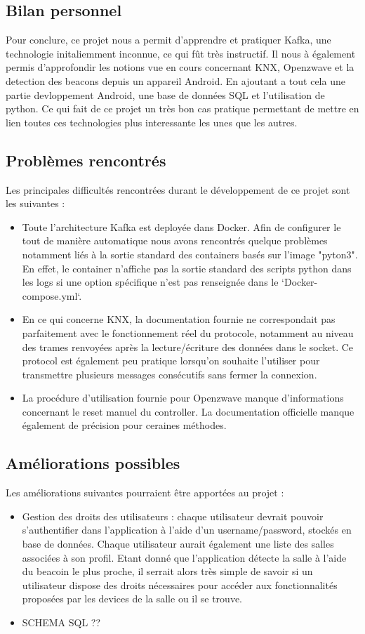 \subsection{Bilan personnel}
Pour conclure, ce projet nous a permit d'apprendre et pratiquer Kafka, une technologie initaliemment inconnue, ce qui fût très instructif. Il nous à également permis d'approfondir les notions vue en cours concernant KNX, Openzwave et la detection des beacons depuis un appareil Android. En ajoutant a tout cela une partie devloppement Android, une base de données SQL et l'utilisation de python. Ce qui fait de ce projet un très bon cas pratique permettant de mettre en lien toutes ces technologies plus interessante les unes que les autres.

\subsection{Problèmes rencontrés}
Les principales difficultés rencontrées durant le développement de ce projet sont les suivantes :
\begin{itemize}
    \item Toute l'architecture Kafka est deployée dans Docker. Afin de configurer le tout de manière automatique nous avons rencontrés quelque problèmes notamment liés à la sortie standard des containers basés sur l'image "pyton3". En effet, le container n'affiche pas la sortie standard des scripts python dans les logs si une option spécifique n'est pas renseignée dans le `Docker-compose.yml`.
    \item En ce qui concerne KNX, la documentation fournie ne correspondait pas parfaitement avec le fonctionnement réel du protocole, notamment au niveau des trames renvoyées après la lecture/écriture des données dans le socket. Ce protocol est également peu pratique lorsqu'on souhaite l'utiliser pour transmettre plusieurs messages consécutifs sans fermer la connexion.
    \item La procédure d'utilisation fournie pour Openzwave manque d'informations concernant le reset manuel du controller. La documentation officielle manque également de précision pour ceraines méthodes.
\end{itemize}

\subsection{Améliorations possibles}
Les améliorations suivantes pourraient être apportées au projet :
\begin{itemize}
    \item Gestion des droits des utilisateurs : chaque utilisateur devrait pouvoir s'authentifier dans l'application à l'aide d'un username/password, stockés en base de données. Chaque utilisateur aurait également une liste des salles associées à son profil. Etant donné que l'application détecte la salle à l'aide du beacoin le plus proche, il serrait alors très simple de savoir si un utilisateur dispose des droits nécessaires pour accéder aux fonctionnalités proposées par les devices de la salle ou il se trouve.
    \item SCHEMA SQL ??
\end{itemize}